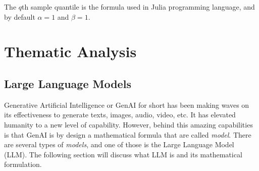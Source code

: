 \begin{remark}
    The $q$th sample quantile is the formula used in Julia programming language, and by default $\alpha=1$ and $\beta=1$.
\end{remark}

\section{Thematic Analysis}


\subsection{Large Language Models}\label{sec:llm_method}
Generative Artificial Intelligence or GenAI for short has been making waves on its effectiveness to generate texts, images, audio, video, etc. It has elevated humanity to a new level of capability. However, behind this amazing capabilities is that GenAI is by design a mathematical formula that are called \textit{model}. There are several types of \textit{models}, and one of those is the Large Language Model (LLM). The following section will discuss what LLM is and its mathematical formulation.
